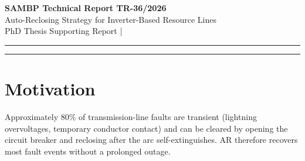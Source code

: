 \documentclass[11pt,a4paper]{article}
\begin{document}
\begin{center}
  {\LARGE\bfseries\color{sambpblue} SAMBP Technical Report TR-36/2026}\\[6pt]
  {\large Auto-Reclosing Strategy for Inverter-Based Resource Lines}\\[10pt]
  {\normalsize PhD Thesis Supporting Report \quad|}
\end{center}

\vspace{2pt}\hrule\vspace{8pt}

\begin{abstract}
\noindent
Auto-reclosing (AR) on IBR-fed transmission lines creates a fundamental conflict:
the arc deionisation dead time always exceeds the memory-polarisation hold time
($T_\mathrm{mem}=100$\,ms), so the protection elements relied upon for the first
trip (Zone~1 quadrilateral, Z2/POTT) are unavailable when the breaker recloses
onto a permanent fault.  This report quantifies the tension using a
current-dependent arc model ($T_\mathrm{arc}\propto\sqrt{k_\mathrm{ibr}}$) and
finds that IBR-limited fault current actually reduces arc deionisation time
relative to synchronous-machine faults: at $k_\mathrm{ibr}=0.15$, $T_\mathrm{dead}=205$\,ms
versus 450\,ms for a SG-only line.  All dead times remain within the IBR
under-voltage ride-through window of 625\,ms.  However, $T_\mathrm{dead}$
always exceeds $T_\mathrm{mem}$, so the second-trip path on reclose-onto-permanent-fault
relies exclusively on 87L (primary, 20\,ms) and 67Q/67N (backup, 30\,ms),
both of which are memory-independent.  Three-phase, single-shot AR with
synchrocheck is recommended; single-phase AR is inappropriate due to
sustained negative-sequence injection into IBR current controllers during
the open-phase interval.
\end{abstract}

\vspace{4pt}\hrule\vspace{10pt}

\section{Motivation}
\label{sec:motivation}

Approximately 80\% of transmission-line faults are transient (lightning
overvoltages, temporary conductor contact) and can be cleared by opening the
circuit breaker and reclosing after the arc self-extinguishes.  AR therefore
recovers most fault events without a prolonged outage.
\end{document}
